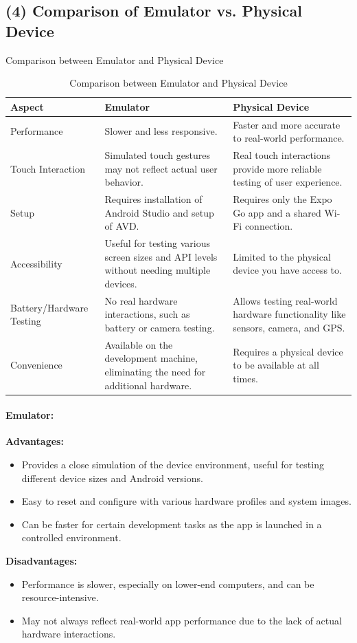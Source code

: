 \documentclass[12pt]{article}
\begin{document}
\subsection*{(4) Comparison of Emulator vs. Physical Device}
\caption{Comparison between Emulator and Physical Device}
\begin{table}[h!]
\centering
\begin{tabular}{|l|p{6cm}|p{6cm}|}
\hline
\textbf{Aspect} & \textbf{Emulator} & \textbf{Physical Device} \\ \hline
Performance & Slower and less responsive. & Faster and more accurate to real-world performance. \\ \hline
Touch Interaction & Simulated touch gestures may not reflect actual user behavior. & Real touch interactions provide more reliable testing of user experience. \\ \hline
Setup & Requires installation of Android Studio and setup of AVD. & Requires only the Expo Go app and a shared Wi-Fi connection. \\ \hline
Accessibility & Useful for testing various screen sizes and API levels without needing multiple devices. & Limited to the physical device you have access to. \\ \hline
Battery/Hardware Testing & No real hardware interactions, such as battery or camera testing. & Allows testing real-world hardware functionality like sensors, camera, and GPS. \\ \hline
Convenience & Available on the development machine, eliminating the need for additional hardware. & Requires a physical device to be available at all times. \\ \hline
\end{tabular}
\caption{Comparison between Emulator and Physical Device}
\label{tab:emulator_vs_physical_device}
\end{table}
\paragraph{Emulator:}
\textbf{Advantages:}
\begin{itemize}
    \item Provides a close simulation of the device environment, useful for testing different device sizes and Android versions.
    \item Easy to reset and configure with various hardware profiles and system images.
    \item Can be faster for certain development tasks as the app is launched in a controlled environment.
\end{itemize}
\textbf{Disadvantages:}
\begin{itemize}
    \item Performance is slower, especially on lower-end computers, and can be resource-intensive.
    \item May not always reflect real-world app performance due to the lack of actual hardware interactions.
\end{itemize}
\end{document}
